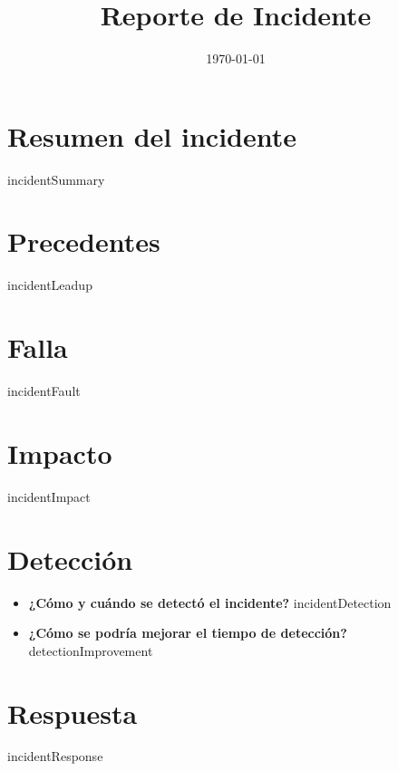 \documentclass[11pt,a4paper]{article}
\title{\textbf{Reporte de Incidente}}
\author{}
\date{\today}
\begin{document}
\maketitle
\tableofcontents
\newpage

\section{Resumen del incidente}
{{incidentSummary}}

\section{Precedentes}
{{incidentLeadup}}

\section{Falla}
{{incidentFault}}

\section{Impacto}
{{incidentImpact}}

\section{Detección}
\begin{itemize}
    \item \textbf{¿Cómo y cuándo se detectó el incidente?}
    \newline
    {{incidentDetection}}

    \item \textbf{¿Cómo se podría mejorar el tiempo de detección?}
    \newline
    {{detectionImprovement}}
    
\end{itemize}

\section{Respuesta}
{{incidentResponse}}
\end{document}

